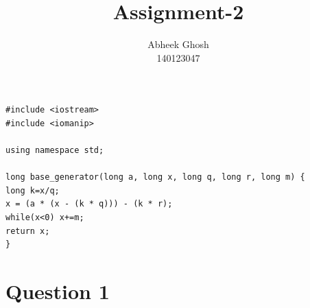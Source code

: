 \documentclass{article}
\begin{document}
	\title{\textbf{Assignment-2}}
	\author{Abheek Ghosh \\ 
		140123047 }
	
	\maketitle
	

\begin{lstlisting}
#include <iostream>
#include <iomanip>

using namespace std;

long base_generator(long a, long x, long q, long r, long m) {
long k=x/q;
x = (a * (x - (k * q))) - (k * r);
while(x<0) x+=m;
return x;
}
\end{lstlisting}

\section{Question 1}

\end{document}
